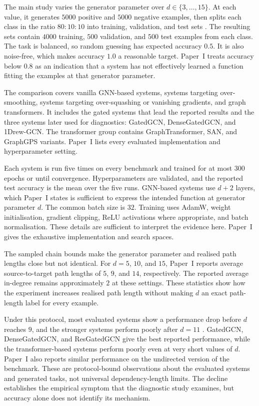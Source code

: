 The main study varies the generator parameter over $d\in\{3,\ldots,15\}$.
At each value, it generates $5000$ positive and $5000$ negative examples, then splits each class in the ratio $80{:}10{:}10$ into training, validation, and test sets \cite{zhou2025glora}.
The resulting sets contain $4000$ training, $500$ validation, and $500$ test examples from each class.
The task is balanced, so random guessing has expected accuracy $0.5$.
It is also noise-free, which makes accuracy $1.0$ a reasonable target.
Paper~I treats accuracy below $0.8$ as an indication that a system has not effectively learned a function fitting the examples at that generator parameter.

The comparison covers vanilla GNN-based systems, systems targeting over-smoothing, systems targeting over-squashing or vanishing gradients, and graph transformers.
It includes the gated systems that lead the reported results and the three systems later used for diagnostics: GatedGCN, DenseGatedGCN, and 1Drew-GCN.
The transformer group contains GraphTransformer, SAN, and GraphGPS variants.
Paper~I lists every evaluated implementation and hyperparameter setting.

Each system is run five times on every benchmark and trained for at most $300$ epochs or until convergence.
Hyperparameters are validated, and the reported test accuracy is the mean over the five runs.
GNN-based systems use $d+2$ layers, which Paper~I states is sufficient to express the intended function at generator parameter $d$.
The common batch size is $32$.
Training uses AdamW, weight initialisation, gradient clipping, ReLU activations where appropriate, and batch normalisation.
These details are sufficient to interpret the evidence here.
Paper~I gives the exhaustive implementation and search spaces.

The sampled chain bounds make the generator parameter and realised path lengths close but not identical.
For $d=5$, $10$, and $15$, Paper~I reports average source-to-target path lengths of $5$, $9$, and $14$, respectively.
The reported average in-degree remains approximately $2$ at these settings.
These statistics show how the experiment increases realised path length without making $d$ an exact path-length label for every example.

Under this protocol, most evaluated systems show a performance drop before $d$ reaches $9$, and the stronger systems perform poorly after $d=11$ \cite{zhou2025glora}.
GatedGCN, DenseGatedGCN, and ResGatedGCN give the best reported performance, while the transformer-based systems perform poorly even at very short values of $d$.
Paper~I also reports similar performance on the undirected version of the benchmark.
These are protocol-bound observations about the evaluated systems and generated tasks, not universal dependency-length limits.
The decline establishes the empirical symptom that the diagnostic study examines, but accuracy alone does not identify its mechanism.

